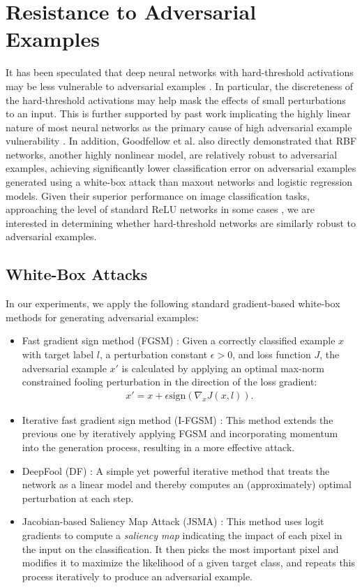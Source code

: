 \section{Resistance to Adversarial Examples}

It has been speculated that deep neural networks with hard-threshold activations may be less vulnerable to adversarial examples \cite{friesen2017deep}. In particular, the discreteness of the hard-threshold activations may help mask the effects of small perturbations to an input. This is further supported by past work implicating the highly linear nature of most neural networks as the primary cause of high adversarial example vulnerability \cite{goodfellow2014}. In addition, Goodfellow et al. also directly demonstrated that RBF networks, another highly nonlinear model, are relatively robust to adversarial examples, achieving significantly lower classification error on adversarial examples generated using a white-box attack than maxout networks and logistic regression models. Given their superior performance on image classification tasks, approaching the level of standard ReLU networks in some cases \cite{friesen2017deep}, we are interested in determining whether hard-threshold networks are similarly robust to adversarial examples. 

\subsection{White-Box Attacks} %

In our experiments, we apply the following standard gradient-based white-box methods for generating adversarial examples: 

\begin{itemize}
\item Fast gradient sign method (FGSM) \cite{goodfellow2014}: Given a correctly classified example $x$ with target label $l$, a perturbation constant $\epsilon > 0$, and loss function $J$, the adversarial example $x'$ is calculated by applying an optimal max-norm constrained fooling perturbation in the direction of the loss gradient:
\begin{align*}
x' = x + \epsilon\textrm{sign}(\nabla_{x}J(x, l)).
\end{align*}
\item Iterative fast gradient sign method (I-FGSM) \cite{dong2017}: This method extends the previous one by iteratively applying FGSM and incorporating momentum into the generation process, resulting in a more effective attack.
\item DeepFool (DF) \cite{dezfooli2016}: A simple yet powerful iterative method that treats the network as a linear model and thereby computes an (approximately) optimal perturbation at each step. 
\item Jacobian-based Saliency Map
Attack (JSMA) \cite{papernot2016b}:  This method uses logit gradients to compute a \textit{saliency map} indicating the impact of each pixel in the input on the classification. It then picks the most important pixel and modifies it to maximize the likelihood of a given target class, and repeats this process iteratively to produce an adversarial example.
\end{itemize}



